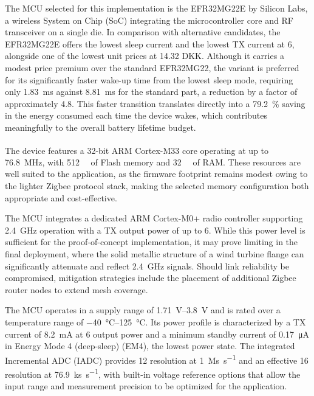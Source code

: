 The MCU selected for this implementation is the EFR32MG22E by Silicon Labs, a wireless System on Chip (SoC) integrating the microcontroller core and RF transceiver on a single die. In comparison with alternative candidates, the EFR32MG22E offers the lowest sleep current and the lowest TX current at \SI{6}{\dBm}, alongside one of the lowest unit prices at 14.32 DKK. Although it carries a modest price premium over the standard EFR32MG22, the variant is preferred for its significantly faster wake-up time from the lowest sleep mode, requiring only \SI{1.83}{\milli\second} against \SI{8.81}{\milli\second} for the standard part, a reduction by a factor of approximately \num{4.8}. This faster transition translates directly into a \SI{79.2}{\percent} saving in the energy consumed each time the device wakes, which contributes meaningfully to the overall battery lifetime budget.

The device features a 32-bit ARM\textsuperscript{\textregistered} Cortex\textsuperscript{\textregistered}-M33 core operating at up to \SI{76.8}{\mega\hertz}, with \SI{512}{\kilo\byte} of Flash memory and \SI{32}{\kilo\byte} of RAM. These resources are well suited to the application, as the firmware footprint remains modest owing to the lighter Zigbee protocol stack, making the selected memory configuration both appropriate and cost-effective.
 
The MCU integrates a dedicated ARM Cortex-M0+ radio controller supporting \SI{2.4}{\giga\hertz} operation with a TX output power of up to \SI{6}{\dBm}. While this power level is sufficient for the proof-of-concept implementation, it may prove limiting in the final deployment, where the solid metallic structure of a wind turbine flange can significantly attenuate and reflect \SI{2.4}{\giga\hertz} signals. Should link reliability be compromised, mitigation strategies include the placement of additional Zigbee router nodes to extend mesh coverage.
 
The MCU operates in a supply range of \SIrange{1.71}{3.8}{\volt} and is rated over a temperature range of \SIrange{-40}{125}{\degreeCelsius}. Its power profile is characterized by a TX current of \SI{8.2}{\milli\ampere} at \SI{6}{\dBm} output power and a minimum standby current of \SI{0.17}{\micro\ampere} in Energy Mode 4 (deep-sleep) (EM4), the lowest power state. The integrated Incremental ADC (IADC) provides \SI{12}{\bit} resolution at \SI{1}{\mega s\per\second} and an effective \SI{16}{\bit} resolution at \SI{76.9}{\kilo s\per\second}, with built-in voltage reference options that allow the input range and measurement precision to be optimized for the application.


